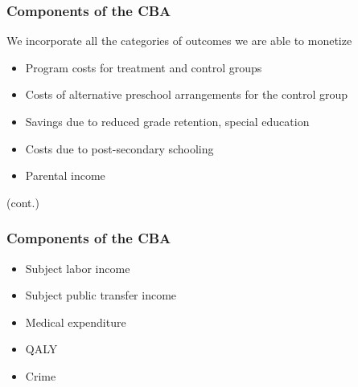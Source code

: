 \documentclass[static]{JJH-Beamer}
\begin{document}

\begin{frame} \label{components}

\frametitle{Components of the CBA}

We incorporate all the categories of outcomes we are able to monetize

\begin{itemize}

	\item Program costs for treatment and control groups

	\item Costs of alternative preschool arrangements for the control group

	\item Savings due to reduced grade retention, special education

	\item Costs due to post-secondary schooling

	\item Parental income

\end{itemize}

(cont.)

\end{frame}








\begin{frame}

\label{components}

\frametitle{Components of the CBA}

\begin{itemize}

	\item Subject labor income

	\item Subject public transfer income

	\item Medical expenditure 

	\item QALY

	\item Crime

\end{itemize}

\end{frame}
\end{document}
